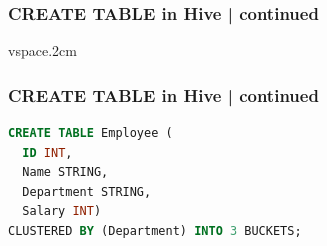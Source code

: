 \begin{frame}
\frametitle{CREATE TABLE in Hive | continued}
\begin{tcolorbox}[colback=white,colframe=black,title= Part 6: Clustering and Sorting | CLUSTERED BY]
	\small
	vspace{.2cm}
	\begin{table}[h!]
		\centering
		\caption{Sample data for employee table}
	\end{table}
\end{tcolorbox}
\end{frame}
\begin{frame}[fragile]
\frametitle{CREATE TABLE in Hive | continued}	
\begin{tcolorbox}[colback=white,colframe=black,title= Part 6: Clustering and Sorting | CLUSTERED BY]
\small
\begin{lstlisting}[caption={Create CLUSTERED Table},language=SQL]
CREATE TABLE Employee (
  ID INT,
  Name STRING,
  Department STRING,
  Salary INT)
CLUSTERED BY (Department) INTO 3 BUCKETS;
\end{lstlisting}
\end{tcolorbox}
\end{frame}

